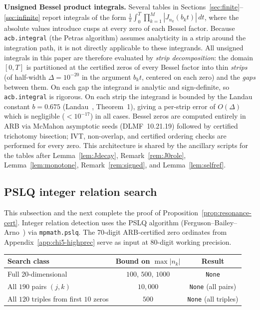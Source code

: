 \documentclass[12pt,reqno]{amsart}
\theoremstyle{plain}
\theoremstyle{definition}
\theoremstyle{remark}
\begin{document}
\medskip\noindent\textbf{Unsigned Bessel product integrals.}  Several tables in Sections~\ref{sec:finite}--\ref{sec:infinite} report integrals of the form $\frac{1}{\pi}\int_0^T \prod_{k=1}^M |J_{n_k}(b_k t)|\, dt$, where the absolute values introduce cusps at every zero of each Bessel factor.  Because \texttt{acb.integral} (the Petras algorithm) assumes analyticity in a strip around the integration path, it is not directly applicable to these integrands.  All unsigned integrals in this paper are therefore evaluated by \emph{strip decomposition}: the domain $[0, T]$ is partitioned at the certified zeros of every Bessel factor into thin \emph{strips} (of half-width $\Delta = 10^{-20}$ in the argument $b_k t$, centered on each zero) and the \emph{gaps} between them.  On each gap the integrand is analytic and sign-definite, so \texttt{acb.integral} is rigorous.  On each strip the integrand is bounded by the Landau constant $b = 0.675$ (Landau~\cite{Landau2000}, Theorem~1), giving a per-strip error of $O(\Delta)$ which is negligible ($< 10^{-17}$) in all cases.  Bessel zeros are computed entirely in ARB via McMahon asymptotic seeds (DLMF~10.21.19) followed by certified trichotomy bisection; IVT, non-overlap, and certified ordering checks are performed for every zero.  This architecture is shared by the ancillary scripts for the tables after Lemma~\ref{lem:Jdecay}, Remark~\ref{rem:J0role}, Lemma~\ref{lem:monotone}, Remark~\ref{rem:signed}, and Lemma~\ref{lem:selfref}.

\subsection{PSLQ integer relation search}\label{subsec:pslq}

This subsection and the next complete the proof of Proposition~\ref{prop:resonance-cert}.  Integer relation detection uses the PSLQ algorithm (Ferguson--Bailey--Arno~\cite{FBA1999}) via \texttt{mpmath.pslq}.  The 70-digit ARB-certified zero ordinates from Appendix~\ref{app:chi5-highprec} serve as input at 80-digit working precision.

\begin{center}
\renewcommand{\arraystretch}{1.1}
\begin{tabular}{lcc}
\toprule
Search class & Bound on $\max|n_k|$ & Result \\
\midrule
Full 20-dimensional & $100$, $500$, $1000$ & \texttt{None} \\
All $190$ pairs $(j,k)$ & $10{,}000$ & \texttt{None} (all pairs) \\
All $120$ triples from first $10$ zeros & $500$ & \texttt{None} (all triples) \\
\bottomrule
\end{tabular}
\end{center}
\end{document}

